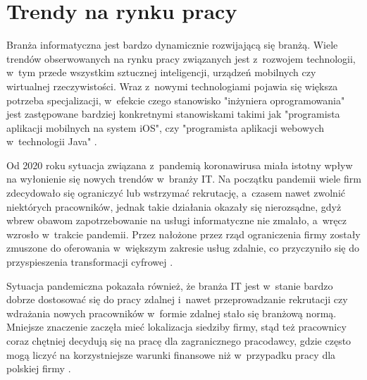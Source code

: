 



\section{Trendy na rynku pracy}\label{sec:trendy}

Branża informatyczna jest bardzo dynamicznie rozwijającą się branżą.
Wiele trendów obserwowanych na rynku pracy związanych jest z~rozwojem technologii, w~tym przede wszystkim sztucznej inteligencji, urządzeń mobilnych czy wirtualnej rzeczywistości.
Wraz z~nowymi technologiami pojawia się większa potrzeba specjalizacji, w~efekcie czego stanowisko "inżyniera oprogramowania" jest zastępowane bardziej konkretnymi stanowiskami takimi jak "programista aplikacji mobilnych na system iOS", czy "programista aplikacji webowych w~technologii Java" \cite{it-polyglots-2015}.

Od 2020 roku sytuacja związana z~pandemią koronawirusa miała istotny wpływ na wyłonienie się nowych trendów w~branży IT.
Na początku pandemii wiele firm zdecydowało się ograniczyć lub wstrzymać rekrutację, a~czasem nawet zwolnić niektórych pracowników, jednak takie działania okazały się nierozsądne, gdyż wbrew obawom zapotrzebowanie na usługi informatyczne nie zmalało, a~wręcz wzrosło w~trakcie pandemii.
Przez nałożone przez rząd ograniczenia firmy zostały zmuszone do oferowania w~większym zakresie usług zdalnie, co przyczyniło się do przyspieszenia transformacji cyfrowej \cite{it-covid-2021}.

Sytuacja pandemiczna pokazała również, że branża IT jest w~stanie bardzo dobrze dostosować się do pracy zdalnej i~nawet przeprowadzanie rekrutacji czy wdrażania nowych pracowników w~formie zdalnej stało się branżową normą.
Mniejsze znaczenie zaczęła mieć lokalizacja siedziby firmy, stąd też pracownicy coraz chętniej decydują się na pracę dla zagranicznego pracodawcy, gdzie często mogą liczyć na korzystniejsze warunki finansowe niż w~przypadku pracy dla polskiej firmy \cite{it-covid-2021}.

